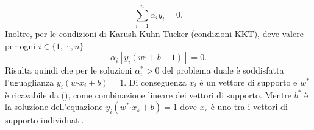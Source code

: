 \documentclass [11pt,a4paper,twoside,openright] {book}
\begin{document}
\begin{equation}
\sum_{i=1}^n \alpha_i y_i = 0.
\end{equation}
Inoltre, per le condizioni di Karush-Kuhn-Tucker \cite{kuhn1951proceedings} (condizioni KKT), deve valere per ogni $i \in \lbrace 1, \cdots, n \rbrace$ 
\begin{equation}
\alpha_i[y_i(w \boldsymbol{\cdot} + b -1)] = 0.
\end{equation}
Risulta quindi che per le soluzioni $\alpha_i^* > 0$ del problema duale è soddisfatta l'uguaglianza $y_i(w \boldsymbol{\cdot} x_i + b) = 1$. Di conseguenza $x_i$ è un vettore di supporto e $w^*$ è ricavabile da (), come combinazione lineare dei vettori di supporto. Mentre $b^*$ è la soluzione dell'equazione $y_i(w^* \boldsymbol{\cdot} x_s + b)= 1$ dove $x_s$ è uno tra i vettori di supporto individuati.
\end{document}
